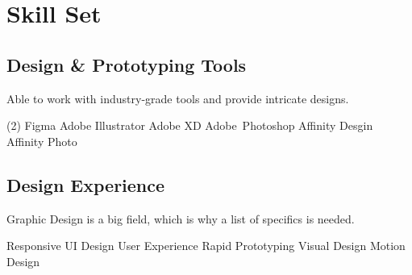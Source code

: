 \section*{Skill Set}
%
%
%
\subsection*{Design \& Prototyping Tools}
Able to work with industry-grade tools and provide intricate designs.
\smallskip
\begin{tasks}(2)
  \task Figma
  \task Adobe Illustrator
  \task Adobe XD
  \task \mbox{Adobe Photoshop}
  \task Affinity Desgin
  \task Affinity Photo
\end{tasks}
%
%
\subsection*{Design Experience}
Graphic Design is a big field, which is why a list of specifics is needed.
\smallskip
\begin{tasks}
  \task Responsive UI Design
  \task User Experience
  \task Rapid Prototyping
  \task Visual Design
  \task Motion Design
\end{tasks}